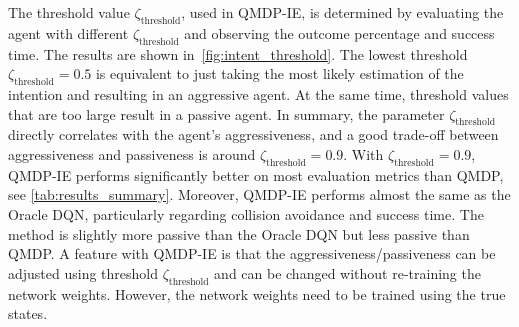 
The threshold value $\zeta_\text{threshold}$, used in QMDP-IE, is determined by evaluating the agent with different $\zeta_\text{threshold}$ and observing the outcome percentage and success time. The results are shown in~\ref{fig:intent_threshold}. The lowest threshold $\zeta_\text{threshold}=0.5$ is equivalent to just taking the most likely estimation of the intention and resulting in an aggressive agent. At the same time, threshold values that are too large result in a passive agent. In summary, the parameter $\zeta_\text{threshold}$ directly correlates with the agent's aggressiveness, and a good trade-off between aggressiveness and passiveness is around $\zeta_\text{threshold}=0.9$. 
With $\zeta_\text{threshold}=0.9$, QMDP-IE performs significantly better on most evaluation metrics than QMDP, see \ref{tab:results_summary}. 
Moreover, QMDP-IE performs almost the same as the Oracle DQN, particularly regarding collision avoidance and success time. The method is slightly more passive than the Oracle DQN but less passive than QMDP. A feature with QMDP-IE is that the aggressiveness/passiveness can be adjusted using threshold $\zeta_\text{threshold}$ and can be changed without re-training the network weights. However, the network weights need to be trained using the true states.  




